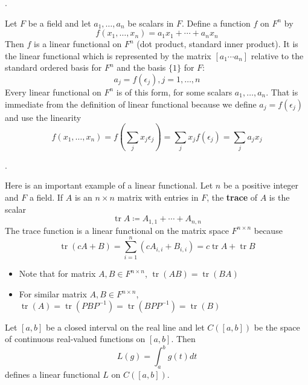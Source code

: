 \documentclass[8pt]{beamer}
\newcommand{\tb}[1]{\textbf{#1}}
\newcommand{\tr}{\operatorname{tr}}
\begin{document}
\begin{frame}{.}
    \begin{example}
        Let $F$ be a field and let $a_1, \dots, a_n$ be scalars in $F$.
        Define a function $f$ on $F^n$ by
        \[
            f(x_1, \dots, x_n) = a_1 x_1 + \cdots + a_n x_n
        \]
        Then $f$ is a linear functional on $F^n$ (dot product, standard inner product).
        It is the linear functional which is represented by the matrix $[a_1 \cdots a_n]$ relative to the standard ordered basis for $F^n$ and the basis $\{1\}$ for $F$:
        \[
            a_j = f(\epsilon_j), j=1, \dots, n
        \]
        Every linear functional on $F^n$ is of this form, for some scalars $a_1, \dots, a_n$.
        That is immediate from the definition of linear functional because we define $a_j = f(\epsilon_j)$ and use the linearity
        \[
            f(x_1, \dots, x_n) = f\left(\sum_j x_j \epsilon_j \right) =\sum_j x_j f(\epsilon_j) = \sum_j a_j x_j
        \]
    \end{example}
\end{frame}

\begin{frame}{.}
    \begin{example}
        Here is an important example of a linear functional.
        Let $n$ be a positive integer and $F$ a field.
        If $A$ is an $n \times n$ matrix with entries in $F$, the \tb{trace} of $A$ is the scalar
        \[
        \tr A \coloneq A_{1,1} + \cdots + A_{n, n}
        \]
        The trace function is a linear functional on the matrix space $F^{n \times n}$ because
        \[
            \tr (cA +B)= \sum_{i=1}^n (cA_{i,i} + B_{i,i}) = c \tr A + \tr B
        \]
    \end{example}

    \begin{itemize}
        \item Note that for matrix $A,B \in F^{n \times n}$, $\tr(AB) = \tr(BA)$
        \item For similar matrix $A,B \in F^{n \times n}$, $\tr(A) = \tr(PBP^{-1}) = \tr(BPP^{-1}) = \tr(B)$
    \end{itemize}

    \begin{example}
        Let $[a,b]$ be a closed interval on the real line and let $C([a,b])$ be the space of continuous real-valued functions on $[a,b]$.
        Then
        \[L(g) = \int_a^b g(t) dt\]
        defines a linear functional $L$ on $C([a,b])$.
    \end{example}
\end{frame}
\end{document}
